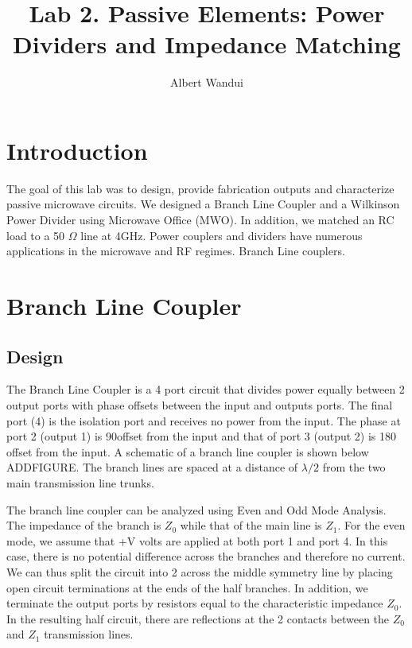\documentclass[twocolumn, aps, apl]{revtex4-1}
\begin{document}
\title{Lab 2. Passive Elements: Power Dividers and Impedance Matching }
\author{Albert Wandui}
\maketitle

\section*{Introduction}
The goal of this lab was to design, provide fabrication outputs and characterize passive microwave circuits. We designed a Branch Line Coupler and a Wilkinson Power Divider using Microwave Office (MWO). In addition, we matched an RC load to a 50 $\Omega$ line at 4GHz. Power couplers and dividers have numerous applications in the microwave and RF regimes. Branch Line couplers.


\section*{Branch Line Coupler}

\subsection{Design}
The Branch Line Coupler is a 4 port circuit that divides power equally between 2 output ports with phase offsets between the input and outputs ports. The final port (4) is the isolation port and receives no power from the input. The phase at port 2 (output 1) is 90\textdegree offset from the input and that of port 3 (output 2) is 180 \textdegree offset from the input. A schematic of a branch line coupler is shown below ADDFIGURE. The branch lines are spaced at a distance of $\lambda/2$ from the two main transmission line trunks. 

The branch line coupler can be analyzed using Even and Odd Mode Analysis. The impedance of the branch is $Z_0$ while that of the main line is $Z_1$. For the even mode, we assume that +V volts are applied at both port 1 and port 4. In this case, there is no potential difference across the branches and therefore no current. We can thus split the circuit into 2 across the middle symmetry line by placing open circuit terminations at the ends of the half branches. In addition, we terminate the output ports by resistors equal to the characteristic impedance $Z_0$. In the resulting half circuit, there are reflections at the 2 contacts between the $Z_0$ and $Z_1$ transmission lines. 
\end{document}
